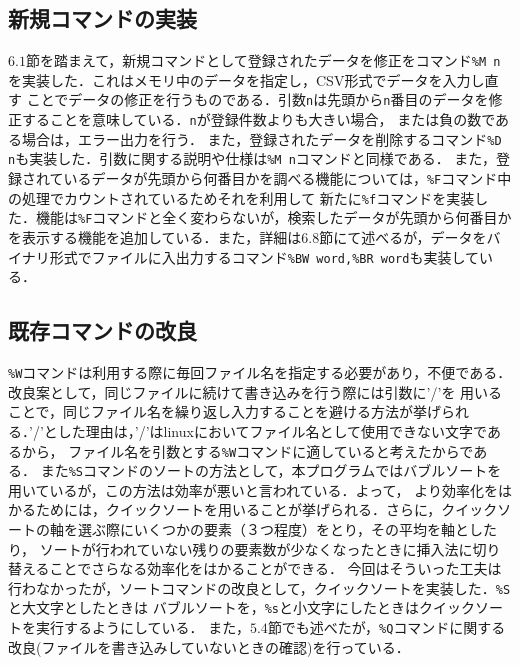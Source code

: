 \documentclass[a4paper,11pt]{jarticle}
\begin{document}
\subsection{新規コマンドの実装}
$6.1$節を踏まえて，新規コマンドとして登録されたデータを修正をコマンド\verb|%M n|を実装した．これはメモリ中のデータを指定し，CSV形式でデータを入力し直す
ことでデータの修正を行うものである．引数\verb|n|は先頭から\verb|n|番目のデータを修正することを意味している．\verb|n|が登録件数よりも大きい場合，
または負の数である場合は，エラー出力を行う．
また，登録されたデータを削除するコマンド\verb|%D n|も実装した．引数に関する説明や仕様は\verb|%M n|コマンドと同様である．
また，登録されているデータが先頭から何番目かを調べる機能については，\verb|%F|コマンド中の処理でカウントされているためそれを利用して
新たに\verb|%f|コマンドを実装した．機能は\verb|%F|コマンドと全く変わらないが，検索したデータが先頭から何番目かを表示する機能を追加している．また，詳細は$6.8$節にて述べるが，データをバイナリ形式でファイルに入出力するコマンド\verb|%BW word,%BR word|も実装している．

\subsection{既存コマンドの改良}
\verb|%W|コマンドは利用する際に毎回ファイル名を指定する必要があり，不便である．改良案として，同じファイルに続けて書き込みを行う際には引数に'/'を
用いることで，同じファイル名を繰り返し入力することを避ける方法が挙げられる．'/'とした理由は，'/'はlinuxにおいてファイル名として使用できない文字であるから，
ファイル名を引数とする\verb|%W|コマンドに適していると考えたからである．
また\verb|%S|コマンドのソートの方法として，本プログラムではバブルソートを用いているが，この方法は効率が悪いと言われている．よって，
より効率化をはかるためには，クイックソートを用いることが挙げられる．さらに，クイックソートの軸を選ぶ際にいくつかの要素（３つ程度）をとり，その平均を軸としたり，
ソートが行われていない残りの要素数が少なくなったときに挿入法に切り替えることでさらなる効率化をはかることができる．
今回はそういった工夫は行わなかったが，ソートコマンドの改良として，クイックソートを実装した．\verb|%S|と大文字としたときは
バブルソートを，\verb|%s|と小文字にしたときはクイックソートを実行するようにしている．
また，$5.4$節でも述べたが，\verb|%Q|コマンドに関する改良(ファイルを書き込みしていないときの確認)を行っている．
\end{document}
